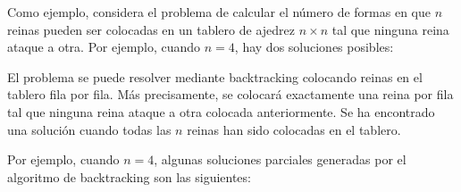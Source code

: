 
Como ejemplo, considera el problema de
calcular el número
de formas en que $n$ reinas pueden ser colocadas en
un tablero de ajedrez $n \times n$ tal que
ninguna reina ataque a otra.
Por ejemplo, cuando $n=4$,
hay dos soluciones posibles:

\begin{center}
\end{center}

El problema se puede resolver mediante backtracking
colocando reinas en el tablero fila por fila.
Más precisamente, se colocará exactamente una reina por fila
tal que ninguna reina ataque a otra colocada anteriormente.
Se ha encontrado una solución cuando todas
las $n$ reinas han sido colocadas en el tablero.

Por ejemplo, cuando $n=4$,
algunas soluciones parciales generadas por
el algoritmo de backtracking son las siguientes:


